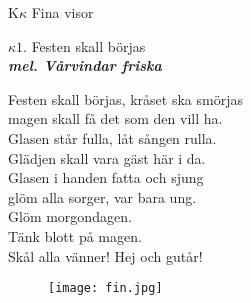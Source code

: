 \documentclass[a6paper,10pt]{article}
\newcommand{\mel}[1]{\small\textbf{\textit{mel. #1 \\}}}
\begin{document}
\noindent
\huge{K$\kappa$ Fina visor}
\begin{center}
\Large $\kappa1$. Festen skall börjas \\ 
\mel{Vårvindar friska}
\end{center}
\small Festen skall börjas, kråset ska smörjas\\
magen skall få det som den vill ha.\\
Glasen står fulla, låt sången rulla.\\
Glädjen skall vara gäst här i da.
\vspace{5pt}\\
Glasen i handen fatta och sjung\\
glöm alla sorger, var bara ung.\\
Glöm morgondagen.\\
Tänk blott på magen.\\
Skål alla vänner! Hej och gutår!
\vfill
\begin{figure}[!h]
\centering
\texttt{[image: fin.jpg]}
\end{figure}
\end{document}
